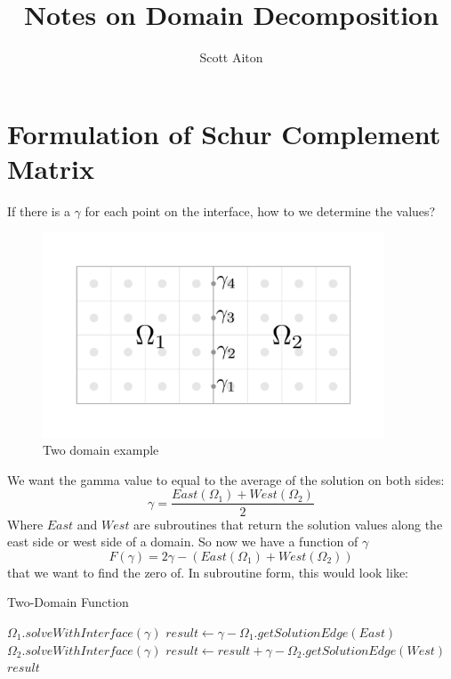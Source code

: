 \documentclass[12pt]{article}
\begin{document}
\title{Notes on Domain Decomposition}
\author{Scott Aiton}
\maketitle

\section{Formulation of Schur Complement Matrix}

If there is a $\gamma$ for each point on the interface, how to we determine the values?
\begin{figure}[H]
    \centering
    \includegraphics[width=4in]{images/abdomain.pdf}
    \caption{Two domain example}
\end{figure}
We want the gamma value to equal to the average of the solution on both sides:
\begin{equation}
    \gamma = \frac{East(\Omega_1)+West(\Omega_2)}{2}
\end{equation}
Where $East$ and $West$ are subroutines that return the solution values along the east side or west side
of a domain.
So now we have a function of $\gamma$
\begin{equation}
    F(\gamma)=2\gamma-(East(\Omega_1)+West(\Omega_2))
    \label{function}
\end{equation}
that we want to find the zero of. In subroutine form, this would look like:
\begin{algorithm}[H]
\caption{Two-Domain Function}
\begin{algorithmic}[1]
    \State $\Omega_1.solveWithInterface(\gamma)$
    \State $result \gets \gamma - \Omega_1.getSolutionEdge(East)$
    \State $\Omega_2.solveWithInterface(\gamma)$
    \State $result \gets result + \gamma - \Omega_2.getSolutionEdge(West)$
    \State \Return $result$
    \EndProcedure
\end{algorithmic}
\end{algorithm}
\end{document}
